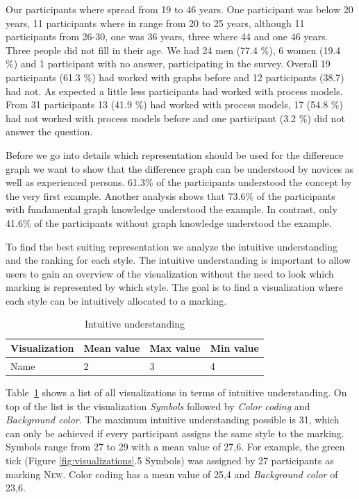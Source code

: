 \documentclass{llncs}
\begin{document}
\begin{keywords}
Our participants where spread  from 19 to 46 years. One participant was below 20 years, 11 participants where in range from 20 to 25 years, although 11 participants from 26-30, one was 36 years, three where 44 and one 46 years. Three people did not fill in their age. We had 24 men (77.4 \%), 6 women (19.4 \%) and 1 participant with no answer, participating in the survey. Overall 19 participants (61.3 \%) had worked with graphs before and 12 participants (38.7) had not. As expected a little less participants had worked with process models. From 31 participants 13 (41.9 \%) had worked with process models, 17 (54.8 \%) had not worked with process models before and one participant (3.2 \%) did not answer the question.

Before we go into details which representation should be used for the difference graph we want to show that the difference graph can be understood by novices as well as experienced persons. 61.3\% of the participants understood the concept by the very first example. Another analysis shows that 73.6\% of the participants with fundamental graph knowledge understood the example. In contrast, only 41.6\% of the participants without graph knowledge understood the example.

To find the best suiting representation we analyze the intuitive understanding and the ranking for each style. The intuitive understanding is important to allow users to gain an overview of the visualization without the need to look which marking is represented by which style. The goal is to find a visualization where each style can be intuitively allocated to a marking.

\begin{table}
\centering
\begin{tabular}{|l|l|l|l|}
	\hline
	Visualization & Mean value  & Max value  & Min value \\
	\hline
	Name & 2 & 3 & 4 \\
	\hline  
\end{tabular}
\caption{Intuitive understanding}
\label{tab:IntuitiveUnderstanding}
\end{table}

Table~\ref{tab:IntuitiveUnderstanding} shows a list of all visualizations in terms of intuitive understanding. On top of the list is the visualization \emph{Symbols} followed by \emph{Color coding} and \emph{Background color}. The maximum intuitive understanding possible is 31, which can only be achieved if every participant assigns the same style to the marking. Symbols range from 27 to 29 with a mean value of 27,6. For example, the green tick (Figure \ref{fig:visualizations}.5 Symbols)  was assigned by 27 participants as marking \textsc{New}. Color coding has a mean value of 25,4 and \emph{Background color} of 23,6.


\end{keywords}
\end{document}
